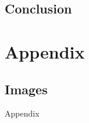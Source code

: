 \documentclass[printGloss, printBibble]{myRUCProject}
\begin{document}


\newpage
\chapter{Conclusion}


\appendix
\part*{Appendix}

\chapter{Images}\label{ap:sfd}
{Appendix}
\end{document}

